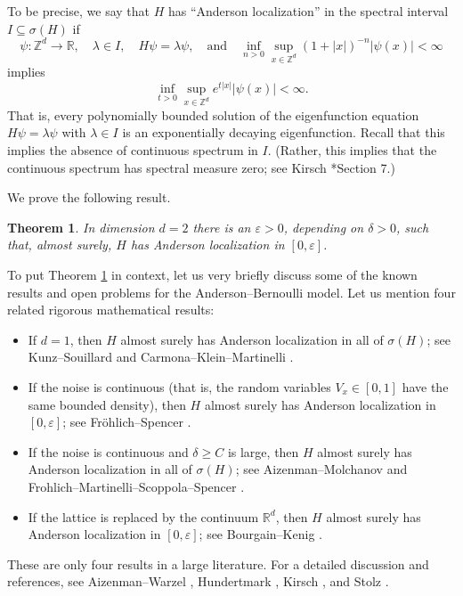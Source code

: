 \documentclass{amsart}
\newtheorem{theorem}[equation]{Theorem}
\newcommand{\tref}[1]{Theorem \ref{t.#1}}
\numberwithin{equation}{section}
\numberwithin{figure}{section}
\newcommand{\Z}{\mathbb{Z}}
\newcommand{\R}{\mathbb{R}}
\newcommand{\ep}{\varepsilon}
\begin{document}
To be precise, we say that $H$ has ``Anderson localization'' in the spectral interval $I \subseteq \sigma(H)$ if
\begin{equation*}
\psi : \Z^d \to \R, \quad
\lambda \in I, \quad
H \psi = \lambda \psi, \quad \mbox{and} \quad
\inf_{n > 0} \sup_{x \in \Z^d} (1 + |x|)^{-n} |\psi(x)| < \infty
\end{equation*} 
implies
\begin{equation*}
\inf_{t > 0} \sup_{x \in \Z^d} e^{t |x|} |\psi(x)| < \infty.
\end{equation*}
That is, every polynomially bounded solution of the eigenfunction equation $H \psi = \lambda \psi$ with $\lambda \in I$ is an exponentially decaying eigenfunction.  Recall that this implies the absence of continuous spectrum in $I$.  (Rather, this implies that the continuous spectrum has spectral measure zero; see Kirsch \cite{Kirsch}*{Section 7}.)

We prove the following result.

\begin{theorem}
\label{t.anderson2d}
In dimension $d = 2$ there is an $\ep > 0$, depending on $\delta > 0$, such that, almost surely, $H$ has Anderson localization in $[0,\ep]$.
\end{theorem}

To put \tref{anderson2d} in context, let us very briefly discuss some of the known results and open problems for the Anderson--Bernoulli model.  Let us mention four related rigorous mathematical results:
\begin{itemize}
\item If $d = 1$, then $H$ almost surely has Anderson localization in all of $\sigma(H)$; see Kunz--Souillard \cite{Kunz-Souillard} and Carmona--Klein--Martinelli \cite{Carmona-Klein-Martinelli}.
\item If the noise is continuous (that is, the random variables $V_x \in [0,1]$ have the same bounded density), then $H$ almost surely has Anderson localization in $[0,\ep]$; see Fr\"ohlich--Spencer \cite{Frohlich-Spencer}.
\item If the noise is continuous and $\delta \geq C$ is large, then $H$ almost surely has Anderson localization in all of $\sigma(H)$; see Aizenman--Molchanov \cite{Aizenman-Molchanov} and Frohlich--Martinelli--Scoppola--Spencer \cite{Frohlich-Martinelli-Scoppola-Spencer}.
\item If the lattice is replaced by the continuum $\R^d$, then $H$ almost surely has Anderson localization in $[0,\ep]$; see Bourgain--Kenig \cite{Bourgain-Kenig}.
\end{itemize}
These are only four results in a large literature.  For a detailed discussion and references, see Aizenman--Warzel \cite{Aizenman-Warzel}, Hundertmark \cite{Hundertmark}, Kirsch \cite{Kirsch}, and Stolz \cite{Stolz}.
\end{document}
